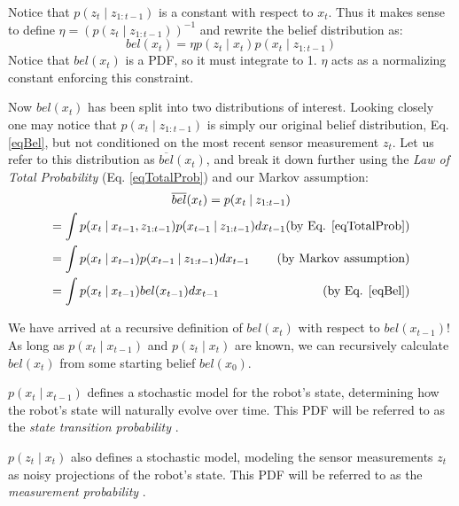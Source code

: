 Notice that \(p(z_t \mathbin{\vert} z_{1:t-1})\) is a constant with respect to \(x_t\). Thus it makes sense to define \(\eta = (p(z_t \mathbin{\vert} z_{1:t-1}))^{-1}\) and rewrite the belief distribution as:
\begin{equation*}
bel(x_t) = \eta p(z_t \mathbin{\vert} x_t) p(x_t \mathbin{\vert} z_{1:t-1})
\end{equation*}
Notice that \(bel(x_t)\) is a PDF, so it must integrate to 1. \(\eta\) acts as a normalizing constant enforcing this constraint.

Now \(bel(x_t)\) has been split into two distributions of interest. Looking closely one may notice that \(p(x_t \mathbin{\vert} z_{1:t-1})\) is simply our original belief distribution, Eq. \ref{eqBel}, but not conditioned on the most recent sensor measurement \(z_t\). Let us refer to this distribution as \(\overline{bel}(x_t)\), and break it down further using the \textit{Law of Total Probability} (Eq. \ref{eqTotalProb}) and our Markov assumption:
\begin{multline*}
\overline{bel}(x_t) = p(x_t \mathbin{\vert} z_{1:t-1}) \\
= \int p(x_t \mathbin{\vert} x_{t-1}, z_{1:t-1}) p(x_{t-1} \mathbin{\vert} z_{1:t-1})dx_{t-1} \hfill \text{(by Eq. \ref{eqTotalProb})}\\
= \int p(x_t \mathbin{\vert} x_{t-1}) p(x_{t-1} \mathbin{\vert} z_{1:t-1})dx_{t-1} \hfill \text{  (by Markov assumption)} \\
= \int p(x_t \mathbin{\vert} x_{t-1}) bel(x_{t-1})dx_{t-1}  \hfill \text{(by Eq. \ref{eqBel})}
\end{multline*}

We have arrived at a recursive definition of \(bel(x_t)\) with respect to \(bel(x_{t-1})\)! As long as \(p(x_t \mathbin{\vert} x_{t-1})\) and \(p(z_t \mathbin{\vert} x_t)\) are known, we can recursively calculate \(bel(x_t)\) from some starting belief \(bel(x_0)\).

\(p(x_t \mathbin{\vert} x_{t-1})\) defines a stochastic model for the robot's state, determining how the robot's state will naturally evolve over time. This PDF will be referred to as the \textit{state transition probability}  \cite{probabilisticRobotics}.

\(p(z_t \mathbin{\vert} x_t)\) also defines a stochastic model, modeling the sensor measurements \(z_t\) as noisy projections of the robot's state. This PDF will be referred to as the \textit{measurement probability}  \cite{probabilisticRobotics}.

